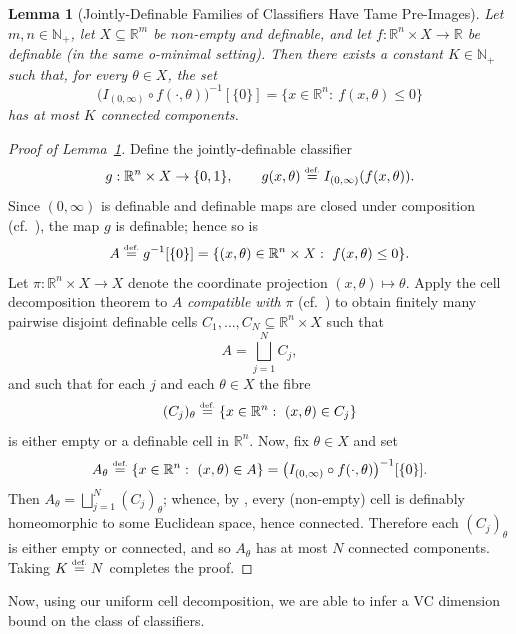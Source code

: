 \documentclass{article}
\newcommand{\eqdef}{\ensuremath{\stackrel{\mbox{\upshape\tiny def.}}{=}}}
\theoremstyle{plain}
\newtheorem{lemma}[theorem]{Lemma}
\theoremstyle{definition}
\theoremstyle{remark}
\theoremstyle{plain}
\numberwithin{thm}{section}
\theoremstyle{definition}
\numberwithin{equation}{section}
\begin{document}
\begin{lemma}[Jointly-Definable Families of Classifiers Have Tame Pre-Images]
\label{lem:finite_connected_components}
Let $m,n\in \mathbb{N}_+$, let $X\subseteq \mathbb{R}^m$ be non-empty and definable, and let
$f:\mathbb{R}^n\times X\to \mathbb{R}$ be definable (in the same o-minimal setting).
Then there exists a constant $K\in\mathbb{N}_+$ such that, for every $\theta\in X$,
the set
\[
\big(I_{(0,\infty)}\circ f(\cdot,\theta)\big)^{-1}[\{0\}]
=
\{x\in\mathbb{R}^n:\ f(x,\theta)\le 0\}
\]
has at most $K$ connected components.
\end{lemma}
\begin{proof}[{Proof of Lemma~\ref{lem:finite_connected_components}}]
Define the jointly-definable classifier
\[
g:\mathbb{R}^n\times X\to \{0,1\},
\qquad
g(x,\theta)\eqdef I_{(0,\infty)}(f(x,\theta)).
\]
Since $(0,\infty)$ is definable and definable maps are closed under composition
(cf.~\citep[Exercise~1.11]{coste1999introduction}), the map $g$ is definable; hence so is
\[
A \eqdef g^{-1}[\{0\}] = \{(x,\theta)\in \mathbb{R}^n\times X:\ f(x,\theta)\le 0\}.
\]
Let $\pi:\mathbb{R}^n\times X\to X$ denote the coordinate projection $(x,\theta)\mapsto \theta$.
Apply the cell decomposition theorem to $A$ \emph{compatible with} $\pi$
(cf.~\citep[Theorem~2.10]{coste1999introduction}) to obtain finitely many pairwise disjoint definable cells
$C_1,\dots,C_N\subseteq \mathbb{R}^n\times X$ such that
\[
A=\bigsqcup_{j=1}^N C_j,
\]
and such that for each $j$ and each $\theta\in X$ the fibre
\[
(C_j)_\theta \eqdef \{x\in\mathbb{R}^n:\ (x,\theta)\in C_j\}
\]
is either empty or a definable cell in $\mathbb{R}^n$.
Now, fix $\theta\in X$ and set
\[
A_\theta \eqdef \{x\in\mathbb{R}^n:\ (x,\theta)\in A\}
=
\big(I_{(0,\infty)}\circ f(\cdot,\theta)\big)^{-1}[\{0\}].
\]
Then
$
A_\theta=\bigsqcup_{j=1}^N (C_j)_\theta
$; whence, by \cite[Proposition 2.5]{coste1999introduction}, every (non-empty) cell is definably homeomorphic to some Euclidean space,
hence connected. Therefore each $(C_j)_\theta$ is either empty or connected, and so $A_\theta$ has at most $N$
connected components. Taking $K\eqdef N$ completes the proof.
\end{proof}

Now, using our uniform cell decomposition, we are able to infer a VC dimension bound on the class of classifiers.
\end{document}
